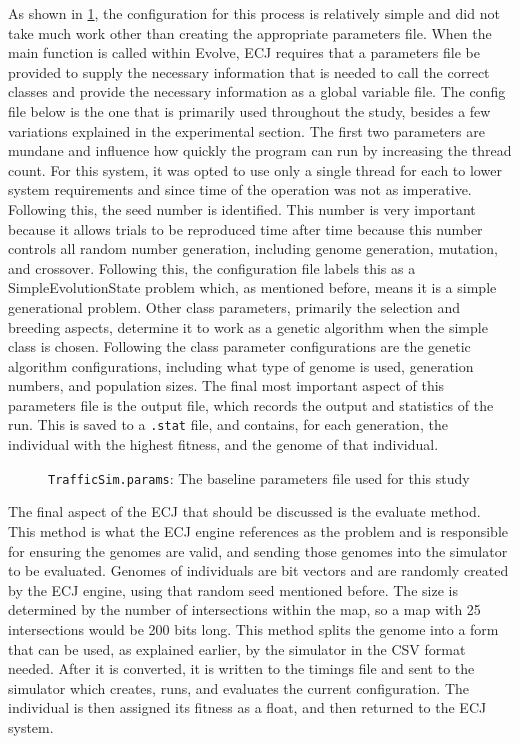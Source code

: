 As shown in \ref{javaprog}, the configuration for this process is relatively simple and did not take much work other than creating the appropriate parameters file.  When the main function is called within Evolve, ECJ requires that a parameters file be provided to supply the necessary information that is needed to call the correct classes and provide the necessary information as a global variable file.  The config file below is the one that is primarily used throughout the study, besides a few variations explained in the experimental section.  The first two parameters are mundane and influence how quickly the program can run by increasing the thread count.  For this system, it was opted to use only a single thread for each to lower system requirements and since time of the operation was not as imperative.  Following this, the seed number is identified.  This number is very important because it allows trials to be reproduced time after time because this number controls all random number generation, including genome generation, mutation, and crossover.  Following this, the configuration file labels this as a SimpleEvolutionState problem which, as mentioned before, means it is a simple generational problem.  Other class parameters, primarily the selection and breeding aspects, determine it to work as a genetic algorithm when the simple class is chosen.  Following the class parameter configurations are the genetic algorithm configurations, including what type of genome is used, generation numbers, and population sizes.  The final most important aspect of this parameters file is the output file, which records the output and statistics of the run.  This is saved to a \texttt{.stat} file, and contains, for each generation, the individual with the highest fitness, and the genome of that individual.

\begin{figure}[htbp]
\centering

\caption{{\tt TrafficSim.params}: The baseline parameters file used for this study}
\label{javaprog}
\end{figure}

The final aspect of the ECJ that should be discussed is the evaluate method.  This method is what the ECJ engine references as the problem and is responsible for ensuring the genomes are valid, and sending those genomes into the simulator to be evaluated.  Genomes of individuals are bit vectors and are randomly created by the ECJ engine, using that random seed mentioned before.  The size is determined by the number of intersections within the map, so a map with 25 intersections would be 200 bits long.  This method splits the genome into a form that can be used, as explained earlier, by the simulator in the CSV format needed.  After it is converted, it is written to the timings file and sent to the simulator which creates, runs, and evaluates the current configuration.  The individual is then assigned its fitness as a float, and then returned to the ECJ system.  

